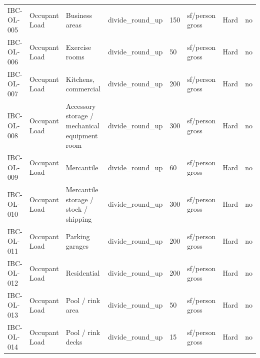 \documentclass[10pt]{article}
\begin{document}
{\begin{longtable}{p{1.75cm}p{2.0cm}p{4.7cm}p{1.2cm}p{1.5cm}p{1.7cm}p{0.9cm}p{1.1cm}}
IBC-OL-005 & Occupant Load & Business areas & divide\_round\_up & 150 & sf/person gross & Hard & no \\
IBC-OL-006 & Occupant Load & Exercise rooms & divide\_round\_up & 50 & sf/person gross & Hard & no \\
IBC-OL-007 & Occupant Load & Kitchens, commercial & divide\_round\_up & 200 & sf/person gross & Hard & no \\
IBC-OL-008 & Occupant Load & Accessory storage / mechanical equipment room & divide\_round\_up & 300 & sf/person gross & Hard & no \\
IBC-OL-009 & Occupant Load & Mercantile & divide\_round\_up & 60 & sf/person gross & Hard & no \\
IBC-OL-010 & Occupant Load & Mercantile storage / stock / shipping & divide\_round\_up & 300 & sf/person gross & Hard & no \\
IBC-OL-011 & Occupant Load & Parking garages & divide\_round\_up & 200 & sf/person gross & Hard & no \\
IBC-OL-012 & Occupant Load & Residential & divide\_round\_up & 200 & sf/person gross & Hard & no \\
IBC-OL-013 & Occupant Load & Pool / rink area & divide\_round\_up & 50 & sf/person gross & Hard & no \\
IBC-OL-014 & Occupant Load & Pool / rink decks & divide\_round\_up & 15 & sf/person gross & Hard & no \\
\bottomrule\end{longtable}}
\end{document}

